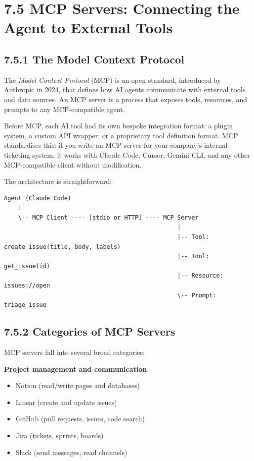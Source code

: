 \documentclass[11pt,a4paper]{book}
\begin{document}
\medskip

\section{7.5 MCP Servers: Connecting the Agent to External Tools}

\subsection{7.5.1 The Model Context Protocol}

The \textit{Model Context Protocol} (MCP) is an open standard, introduced by Anthropic in 2024, that defines how AI agents communicate with external tools and data sources. An MCP server is a process that exposes tools, resources, and prompts to any MCP-compatible agent.

Before MCP, each AI tool had its own bespoke integration format: a plugin system, a custom API wrapper, or a proprietary tool definition format. MCP standardises this: if you write an MCP server for your company's internal ticketing system, it works with Claude Code, Cursor, Gemini CLI, and any other MCP-compatible client without modification.

The architecture is straightforward:

\begin{lstlisting}
Agent (Claude Code)
    |
    \-- MCP Client ---- [stdio or HTTP] ---- MCP Server
                                                 |
                                                 |-- Tool: create_issue(title, body, labels)
                                                 |-- Tool: get_issue(id)
                                                 |-- Resource: issues://open
                                                 \-- Prompt: triage_issue
\end{lstlisting}

\subsection{7.5.2 Categories of MCP Servers}

MCP servers fall into several broad categories:

\textbf{Project management and communication}
\begin{itemize}
  \item Notion (read/write pages and databases)
  \item Linear (create and update issues)
  \item GitHub (pull requests, issues, code search)
  \item Jira (tickets, sprints, boards)
  \item Slack (send messages, read channels)
\end{itemize}
\end{document}
